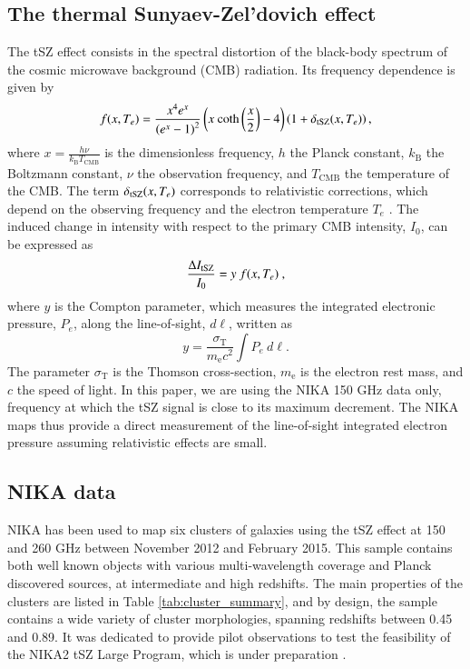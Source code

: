 \documentclass[twocolumn,traditabstract]{aa}
\begin{document}
\subsection{The thermal Sunyaev-Zel'dovich effect}
The tSZ effect consists in the spectral distortion of the black-body spectrum of the cosmic microwave background (CMB) radiation. Its frequency dependence is given by \citep{birkinshaw1999}
\begin{equation}
	f(x, T_e) = \frac{x^4 e^x}{\left(e^x-1\right)^2} \left(x \ \mathrm{coth}\left(\frac{x}{2}\right) - 4\right) \left(1 + \delta_{\rm tSZ}(x, T_e) \right),
	\label{eq:sz_f_x}
\end{equation}
where $x = \frac{h \nu}{k_{\mathrm{B}} T_{\mathrm{CMB}}}$ is the dimensionless frequency, $h$ the Planck constant, $k_{\mathrm{B}}$ the Boltzmann constant, $\nu$ the observation frequency, and $T_{\mathrm{CMB}}$ the temperature of the CMB. The term $\delta_{\rm tSZ}(x,T_e)$ corresponds to relativistic corrections, which depend on the observing frequency and the electron temperature $T_e$ \citep[see, e.g.][]{Itoh2003}. The induced change in intensity with respect to the primary CMB intensity, $I_0$, can be expressed as
\begin{equation}
	\frac{\Delta I_{\rm tSZ}}{I_0} = y \ f(x, T_e) \ ,
\label{eq:deltaI}
\end{equation}
where $y$ is the Compton parameter, which measures the integrated electronic pressure, $P_{e}$, along the line-of-sight, $d\ell$, written as
   \begin{equation}
	y = \frac{\sigma_{\mathrm{T}}}{m_{\mathrm{e}} c^2} \int P_{e} \ d\ell.
	\label{eq:y_compton}
   \end{equation}
The parameter $\sigma_{\mathrm{T}}$ is the Thomson cross-section, $m_{\mathrm{e}}$ is the electron rest mass, and $c$ the speed of light. In this paper, we are using the NIKA 150 GHz data only, frequency at which the tSZ signal is close to its maximum decrement. The NIKA maps thus provide a direct measurement of the line-of-sight integrated electron pressure assuming relativistic effects are small.

\subsection{NIKA data}\label{sec:NIKA_Data}
NIKA has been used to map six clusters of galaxies using the tSZ effect at 150 and 260 GHz between November 2012 and February 2015. This sample contains both well known objects with various multi-wavelength coverage and Planck discovered sources, at intermediate and high redshifts. The main properties of the clusters are listed in Table \ref{tab:cluster_summary}, and by design, the sample contains a wide variety of cluster morphologies, spanning redshifts between 0.45 and 0.89. It was dedicated to provide pilot observations to test the feasibility of the NIKA2 tSZ Large Program, which is under preparation \citep{Comis2016}. 
\end{document}
